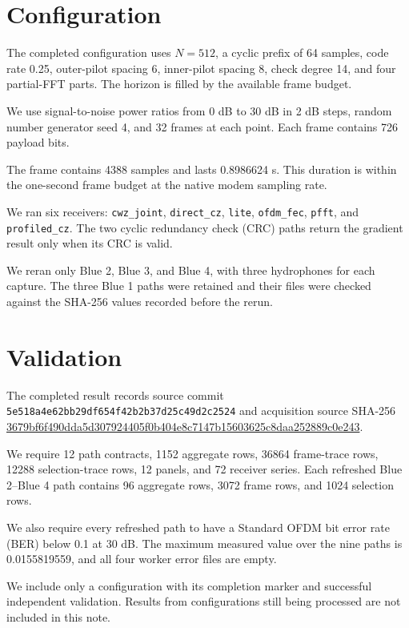 \documentclass[11pt]{article}
\begin{document}
\section{Configuration}

The completed configuration uses $N=512$, a cyclic prefix of 64 samples, code
rate 0.25, outer-pilot spacing 6, inner-pilot spacing 8, check degree 14, and
four partial-FFT parts.  The horizon is filled by the available frame budget.

We use signal-to-noise power ratios from 0 dB to 30 dB in 2 dB steps, random
number generator seed 4, and 32 frames at each point.  Each frame contains 726
payload bits.

The frame contains 4388 samples and lasts 0.8986624 s.  This duration is within
the one-second frame budget at the native modem sampling rate.

We ran six receivers: \texttt{cwz\_joint}, \texttt{direct\_cz},
\texttt{lite}, \texttt{ofdm\_fec}, \texttt{pfft}, and
\texttt{profiled\_cz}.  The two cyclic redundancy check (CRC) paths return the
gradient result only when its CRC is valid.

We reran only Blue 2, Blue 3, and Blue 4, with three hydrophones for each
capture.  The three Blue 1 paths were retained and their files were checked
against the SHA-256 values recorded before the rerun.

\section{Validation}

The completed result records source commit
\texttt{5e518a4e62bb29df654f42b2b37d25c49d2c2524} and acquisition source SHA-256
\url{3679bf6f490dda5d307924405f0b404e8c7147b15603625c8daa252889c0e243}.

We require 12 path contracts, 1152 aggregate rows, 36864 frame-trace rows,
12288 selection-trace rows, 12 panels, and 72 receiver series.  Each refreshed
Blue 2--Blue 4 path contains 96 aggregate rows, 3072 frame rows, and 1024
selection rows.

We also require every refreshed path to have a Standard OFDM bit error rate
(BER) below 0.1 at 30 dB.  The maximum measured value over the nine paths is
0.0155819559, and all four worker error files are empty.

We include only a configuration with its completion marker and successful
independent validation.  Results from configurations still being processed are
not included in this note.
\end{document}
